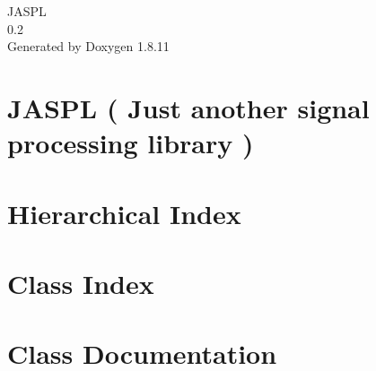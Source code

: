 \documentclass[twoside]{book}
\newcommand{\+}{\discretionary{\mbox{\scriptsize$\hookleftarrow$}}{}{}}
\newcommand{\clearemptydoublepage}{%
  \newpage{\pagestyle{empty}\cleardoublepage}%
}
\begin{document}
\hypersetup{pageanchor=false,
             bookmarksnumbered=true,
             pdfencoding=unicode
            }
\begin{titlepage}
\vspace*{7cm}
\begin{center}%
{\Large J\+A\+S\+PL \\[1ex]\large 0.\+2 }\\
\vspace*{1cm}
{\large Generated by Doxygen 1.8.11}\\
\end{center}
\end{titlepage}
\clearemptydoublepage
\tableofcontents
\clearemptydoublepage
{}
\hypersetup{pageanchor=true}

\chapter{J\+A\+S\+PL ( Just another signal processing library )}
\label{md__home_bephillips2_Qt-Projects_JASPL_README}
\hypertarget{md__home_bephillips2_Qt-Projects_JASPL_README}{}

\chapter{Hierarchical Index}

\chapter{Class Index}

\chapter{Class Documentation}





























\backmatter
\newpage
{}
\clearemptydoublepage
{}
\printindex
\end{document}

